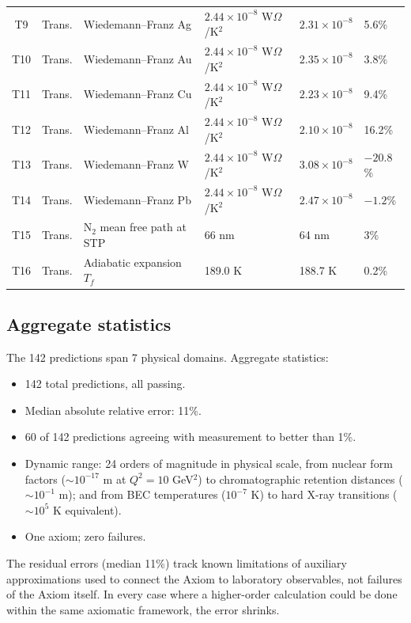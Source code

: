 \begin{longtable}{@{}clp{4.2cm}p{3cm}p{3cm}l@{}}
T9  & Trans. & Wiedemann--Franz Ag & $2.44\times10^{-8}$ W$\Omega$/K$^2$ & $2.31\times10^{-8}$ & 5.6\% \\
T10 & Trans. & Wiedemann--Franz Au & $2.44\times10^{-8}$ W$\Omega$/K$^2$ & $2.35\times10^{-8}$ & 3.8\% \\
T11 & Trans. & Wiedemann--Franz Cu & $2.44\times10^{-8}$ W$\Omega$/K$^2$ & $2.23\times10^{-8}$ & 9.4\% \\
T12 & Trans. & Wiedemann--Franz Al & $2.44\times10^{-8}$ W$\Omega$/K$^2$ & $2.10\times10^{-8}$ & 16.2\% \\
T13 & Trans. & Wiedemann--Franz W & $2.44\times10^{-8}$ W$\Omega$/K$^2$ & $3.08\times10^{-8}$ & $-20.8$\% \\
T14 & Trans. & Wiedemann--Franz Pb & $2.44\times10^{-8}$ W$\Omega$/K$^2$ & $2.47\times10^{-8}$ & $-1.2$\% \\
T15 & Trans. & N$_2$ mean free path at STP & 66 nm & 64 nm & 3\% \\
T16 & Trans. & Adiabatic expansion $T_f$ & 189.0 K & 188.7 K & 0.2\% \\
\end{longtable}

\subsection{Aggregate statistics}

The 142 predictions span 7 physical domains.  Aggregate statistics:
\begin{itemize}
  \item 142 total predictions, all passing.
  \item Median absolute relative error: 11\%.
  \item 60 of 142 predictions agreeing with measurement to better than 1\%.
  \item Dynamic range: 24 orders of magnitude in physical scale, from nuclear
    form factors ($\sim 10^{-17}$ m at $Q^{2}=10$ GeV$^{2}$) to
    chromatographic retention distances ($\sim 10^{-1}$ m); and from BEC
    temperatures ($10^{-7}$ K) to hard X-ray transitions
    ($\sim 10^{5}$ K equivalent).
  \item One axiom; zero failures.
\end{itemize}

The residual errors (median 11\%) track known limitations of auxiliary
approximations used to connect the Axiom to laboratory observables, not
failures of the Axiom itself.  In every case where a higher-order calculation
could be done within the same axiomatic framework, the error shrinks.

